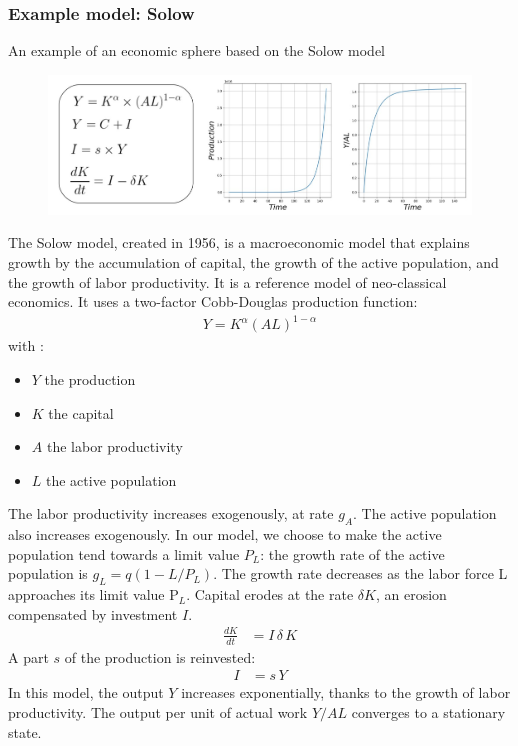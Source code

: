 \documentclass[12pt,a4paper]{article}%
\begin{document}
\begin{appendix}
\subsubsection{{Example model: Solow}} 
\label{sec:Solow}
{An example of an economic sphere based on the Solow model}  
\begin{figure}[h] 
	\centering 
	\includegraphics[width=1.0\textwidth]{figures/solow2.jpg}
\end{figure} 
The Solow model, created in 1956, is a macroeconomic model that explains growth by the accumulation of capital, the growth of the active population, and the growth of labor productivity. It is a reference model of neo-classical economics.  It uses a two-factor Cobb-Douglas production function:
\begin{align}
	Y=K^{\alpha}(AL)^{1-\alpha}
\end{align}  with :  
\begin{itemize} 
	\item $Y$ the production 
	\item $K$ the capital 
	\item $A$ the labor productivity 
	\item $L$ the active population 
\end{itemize} 
The labor productivity increases exogenously, at rate $g_{A }$.  The active population also increases exogenously. In our model, we choose to make the active population tend towards a limit value $P_{L}$: the growth rate of the active population is $g_{L}=q(1-L/P_{L})$. The growth rate decreases as the labor force L approaches its limit value P$_{L}$.  Capital erodes at the rate $\delta K$, an erosion compensated by investment $I$.  
\begin{align}
	\frac{d K}{d t} & = I \, \delta \, K
\end{align} 
A part $s$ of the production is reinvested:  
\begin{align}
	I &= s \, Y 
\end{align}
In this model, the output $Y$ increases exponentially, thanks to the growth of labor productivity. The output per unit of actual work $Y/AL$ converges to a stationary state.  


\end{appendix}
\end{document}
